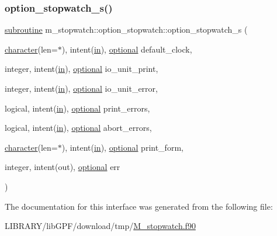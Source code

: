 \subsubsection{\texorpdfstring{option\+\_\+stopwatch\+\_\+s()}{option\_stopwatch\_s()}}
{\footnotesize\ttfamily \hyperlink{M__stopwatch_83_8txt_acfbcff50169d691ff02d4a123ed70482}{subroutine} m\+\_\+stopwatch\+::option\+\_\+stopwatch\+::option\+\_\+stopwatch\+\_\+s (\begin{DoxyParamCaption}\item[{\hyperlink{option__stopwatch_83_8txt_abd4b21fbbd175834027b5224bfe97e66}{character}(len=$\ast$), intent(\hyperlink{M__journal_83_8txt_afce72651d1eed785a2132bee863b2f38}{in}), \hyperlink{option__stopwatch_83_8txt_aa4ece75e7acf58a4843f70fe18c3ade5}{optional}}]{default\+\_\+clock,  }\item[{integer, intent(\hyperlink{M__journal_83_8txt_afce72651d1eed785a2132bee863b2f38}{in}), \hyperlink{option__stopwatch_83_8txt_aa4ece75e7acf58a4843f70fe18c3ade5}{optional}}]{io\+\_\+unit\+\_\+print,  }\item[{integer, intent(\hyperlink{M__journal_83_8txt_afce72651d1eed785a2132bee863b2f38}{in}), \hyperlink{option__stopwatch_83_8txt_aa4ece75e7acf58a4843f70fe18c3ade5}{optional}}]{io\+\_\+unit\+\_\+error,  }\item[{logical, intent(\hyperlink{M__journal_83_8txt_afce72651d1eed785a2132bee863b2f38}{in}), \hyperlink{option__stopwatch_83_8txt_aa4ece75e7acf58a4843f70fe18c3ade5}{optional}}]{print\+\_\+errors,  }\item[{logical, intent(\hyperlink{M__journal_83_8txt_afce72651d1eed785a2132bee863b2f38}{in}), \hyperlink{option__stopwatch_83_8txt_aa4ece75e7acf58a4843f70fe18c3ade5}{optional}}]{abort\+\_\+errors,  }\item[{\hyperlink{option__stopwatch_83_8txt_abd4b21fbbd175834027b5224bfe97e66}{character}(len=$\ast$), intent(\hyperlink{M__journal_83_8txt_afce72651d1eed785a2132bee863b2f38}{in}), \hyperlink{option__stopwatch_83_8txt_aa4ece75e7acf58a4843f70fe18c3ade5}{optional}}]{print\+\_\+form,  }\item[{integer, intent(out), \hyperlink{option__stopwatch_83_8txt_aa4ece75e7acf58a4843f70fe18c3ade5}{optional}}]{err }\end{DoxyParamCaption})\hspace{0.3cm}{\ttfamily [private]}}



The documentation for this interface was generated from the following file\+:\begin{DoxyCompactItemize}
\item 
L\+I\+B\+R\+A\+R\+Y/lib\+G\+P\+F/download/tmp/\hyperlink{M__stopwatch_8f90}{M\+\_\+stopwatch.\+f90}\end{DoxyCompactItemize}
